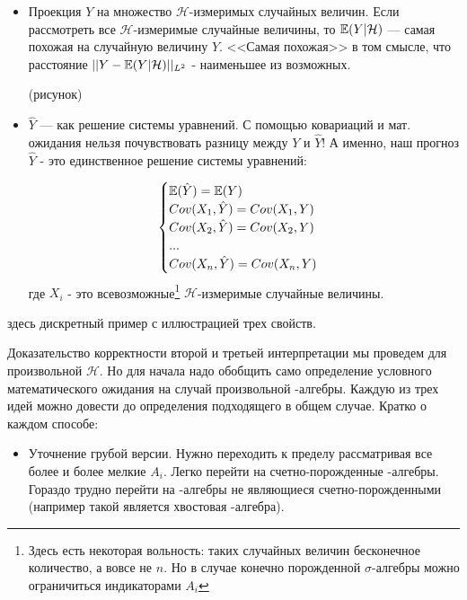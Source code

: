 {\begin{itemize}
\item Проекция $Y$ на множество $\mathcal{H}$-измеримых случайных величин. Если рассмотреть все $\mathcal{H}$-измеримые случайные величины, то $\mathbb{E}(Y|\mathcal{H})$ --- самая похожая на случайную величину $Y$. <<Самая похожая>> в том смысле, что расстояние $||Y-\mathbb{E}(Y|\mathcal{H})||_{L^{2}}$ - наименьшее из возможных.


(рисунок)
\item $ \hat{Y} $ --- как решение системы уравнений. С помощью ковариаций и мат. ожидания нельзя почувствовать разницу между $Y$ и $\hat{Y}$! А именно, наш прогноз $\hat{Y}$ - это единственное решение системы уравнений:

\begin{equation}
\begin{cases}
\mathbb{E}(\hat{Y})=\mathbb{E}(Y) \\
Cov(X_{1},\hat{Y})=Cov(X_{1},Y) \\
Cov(X_{2},\hat{Y})=Cov(X_{2},Y) \\
... \\
Cov(X_{n},\hat{Y})=Cov(X_{n},Y) \\
\end{cases}
\end{equation}
где $X_{i}$ - это всевозможные\footnote{Здесь есть некоторая вольность: таких случайных величин бесконечное количество, а вовсе не $n$. Но в случае конечно порожденной $ \sigma $-алгебры можно ограничиться индикаторами $ A_{i} $}   $\mathcal{H}$-измеримые случайные величины.

\end{itemize}

\begin{myex}
здесь дискретный пример с иллюстрацией трех свойств.

\end{myex}

Доказательство корректности второй и третьей интерпретации мы проведем для произвольной $\mathcal{H}$. Но для начала надо обобщить само определение условного математического ожидания на случай произвольной \s-алгебры. Каждую из трех идей можно довести до определения подходящего в общем случае. Кратко о каждом способе:

\begin{itemize}

\item Уточнение грубой версии. Нужно переходить к пределу рассматривая все более и более мелкие $A_{i}$. Легко перейти на счетно-порожденные \s-алгебры. Гораздо трудно перейти на \s-алгебры не являющиеся счетно-порожденными (например такой является хвостовая \s-алгебра).


\end{itemize}}
